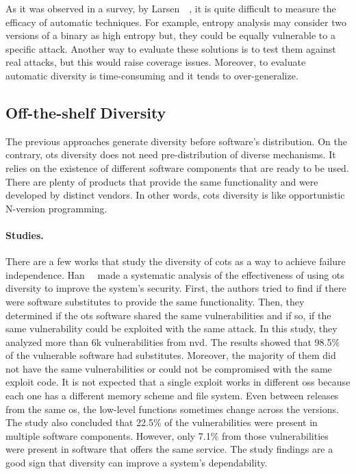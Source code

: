 As it was observed in a survey, by Larsen~\etal{}~\cite{Larsen:2015}, it is quite difficult to measure the efficacy of automatic techniques.
For example, entropy analysis may consider two versions of a binary as high entropy but, they could be equally vulnerable to a specific attack.
Another way to evaluate these solutions is to test them against real attacks, but this would raise coverage issues.
Moreover, to evaluate automatic diversity is time-consuming and it tends to over-generalize.


\subsection{Off-the-shelf Diversity}
The previous approaches generate diversity before software’s distribution. 
On the contrary, \gls{ots} diversity does not need pre-distribution of diverse mechanisms. 
It relies on the existence of different software components that are ready to be used.
There are plenty of products that provide the same functionality and were developed by distinct vendors. 
In other words, \gls{cots} diversity is like opportunistic N-version programming.


\paragraph{Studies.}
There are a few works that study the diversity of \gls{cots} as a way to achieve failure independence.
Han~\etal{}~\cite{Han:2009} made a systematic analysis of the effectiveness of using \gls{ots} diversity to improve the system's security.
First, the authors tried to find if there were software substitutes to provide the same functionality. 
Then, they determined if the \gls{ots} software shared the same vulnerabilities and if so, if the same vulnerability could be exploited with the same attack. 
In this study, they analyzed more than 6k vulnerabilities from \gls{nvd}. 
The results showed that 98.5$\%$ of the vulnerable software had substitutes. 
Moreover, the majority of them did not have the same vulnerabilities or could not be compromised with the same exploit code. 
It is not expected that a single exploit works in different \glspl{os} because each one has a different memory scheme and file system. 
Even between releases from the same \gls{os}, the low-level functions sometimes change across the versions. 
The study also concluded that 22.5$\%$ of the vulnerabilities were present in multiple software components. 
However, only 7.1$\%$ from those vulnerabilities were present in software that offers the same service. 
The study findings are a good sign that diversity can improve a system’s dependability.

